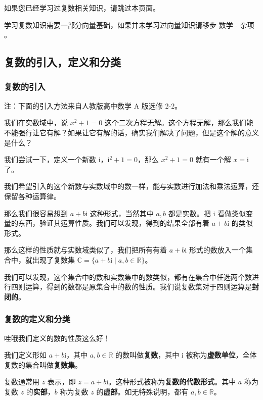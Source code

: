 
如果您已经学习过复数相关知识，请跳过本页面。

学习复数知识需要一部分向量基础，如果并未学习过向量知识请移步 数学 - 杂项 。

\subsection{复数的引入，定义和分类}

\subsubsection{复数的引入}

注：下面的引入方法来自人教版高中数学 A 版选修 2-2。

我们在实数域中，说 $x^2+1=0$ 这个二次方程无解。这个方程无解，那么我们能不能强行让它有解？如果让它有解的话，确实我们解决了问题，但是这个解的意义是什么？

我们尝试一下，定义一个新数 $\text{i}$，$\text{i}^2+1=0$，那么 $x^2+1=0$ 就有一个解 $x=\text{i}$ 了。

我们希望引入的这个新数与实数域中的数一样，能与实数进行加法和乘法运算，还保留各种运算律。

那么我们很容易想到 $a+b\text{i}$ 这种形式，当然其中 $a,b$ 都是实数。把 $\text{i}$ 看做类似变量的东西，验证其运算性质。我们可以发现，得到的结果全部有着 $a+b\text{i}$ 的类似形式。

那么这样的性质就与实数域类似了，我们把所有有着 $a+b\text{i}$ 形式的数放入一个集合中，就出现了复数集 $\mathbb{C}=\{a+b\text{i} \mid a,b\in \mathbb{R}\}$。

我们可以发现，这个集合中的数和实数集中的数类似，都有在集合中任选两个数进行四则运算，得到的数都是原集合中的数的性质。我们说复数集对于四则运算是\textbf{封闭的}。

\subsubsection{复数的定义和分类}

\begin{QUOTE}{}{}
哇哦我们定义的数的性质这么好！
\end{QUOTE}

我们定义形如 $a+b\text{i}$，其中 $a,b\in \mathbb{R}$ 的数叫做\textbf{复数}，其中 $\text{i}$ 被称为\textbf{虚数单位}，全体复数的集合叫做\textbf{复数集}。

复数通常用 $z$ 表示，即 $z=a+b\text{i}$。这种形式被称为\textbf{复数的代数形式}。其中 $a$ 称为复数 $z$ 的\textbf{实部}，$b$ 称为复数 $z$ 的\textbf{虚部}。如无特殊说明，都有 $a,b\in \mathbb{R}$。

